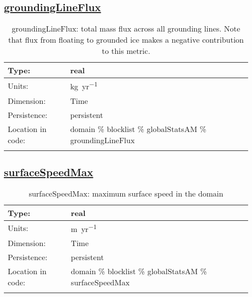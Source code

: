 \subsection[groundingLineFlux]{\hyperref[sec:var_tab_globalStatsAM]{groundingLineFlux}}
\label{subsec:var_sec_globalStatsAM_groundingLineFlux}
\begin{center}
\begin{longtable}{| p{2.0in} | p{4.0in} |}
        \hline 
        Type: & real \\
        \hline 
        Units: & \si{kg.yr^{-1}} \\
        \hline 
        Dimension: & Time \\
        \hline 
        Persistence: & persistent \\
        \hline 
         Location in code: & domain \% blocklist \% globalStatsAM \% groundingLineFlux \\
         \hline 
    \caption{groundingLineFlux: total mass flux across all grounding lines.  Note that flux from floating to grounded ice makes a negative contribution to this metric.}
\end{longtable}
\end{center}
\subsection[surfaceSpeedMax]{\hyperref[sec:var_tab_globalStatsAM]{surfaceSpeedMax}}
\label{subsec:var_sec_globalStatsAM_surfaceSpeedMax}
\begin{center}
\begin{longtable}{| p{2.0in} | p{4.0in} |}
        \hline 
        Type: & real \\
        \hline 
        Units: & \si{m.yr^{-1}} \\
        \hline 
        Dimension: & Time \\
        \hline 
        Persistence: & persistent \\
        \hline 
         Location in code: & domain \% blocklist \% globalStatsAM \% surfaceSpeedMax \\
         \hline 
    \caption{surfaceSpeedMax: maximum surface speed in the domain}
\end{longtable}
\end{center}
